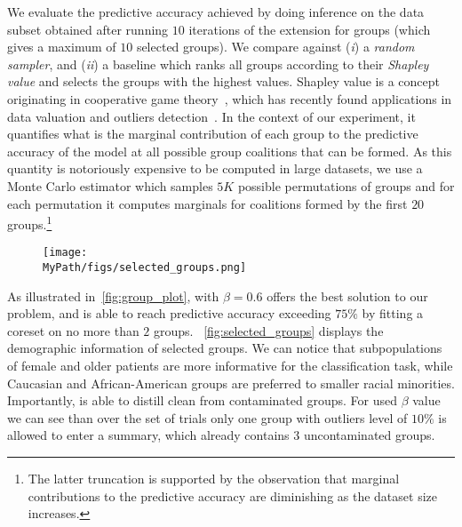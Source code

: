 We evaluate the predictive accuracy achieved by doing inference on the data subset obtained after running $10$ iterations of the \bcores{} extension for groups (which gives a maximum of $10$ selected groups). We compare against (\emph{i}) a \emph{random sampler}, and (\emph{ii}) a baseline which ranks all groups according to their \emph{Shapley value} and selects the groups with the highest values. Shapley value is a concept originating in cooperative game theory~\citep{shapley53}, which has recently found applications in data valuation and outliers detection~\citep{ghorbani19}. In the context of our experiment, it quantifies what is the marginal contribution of each group to the predictive accuracy of the model at all possible group coalitions that can be formed. As this quantity is notoriously expensive to be computed in large datasets, we use a Monte Carlo estimator which samples $5K$ possible permutations of groups and for each permutation it computes marginals for coalitions formed by the first $20$ groups.\footnote{The latter truncation is supported by the observation that marginal contributions to the predictive accuracy are diminishing as the dataset size increases.}

\begin{figure*}[!t]
	\begin{subfigure}[b]{.8\textwidth} 
		\centering
		\texttt{[image: \\MyPath/figs/selected\_groups.png]}
	\end{subfigure}	
	\centering
	\caption{Attributes of selected groups after running $10$ iterations of \bcores{} with $\beta=0.6$ on the contaminated \textsc{HospitalReadmissions} dataset (repeated over $5$ random trials).}
	\label{fig:selected_groups}
\end{figure*}

As illustrated in~\cref{fig:group_plot}, \bcores{} with $\beta=0.6$ offers the best solution to our problem, and is able to reach predictive accuracy exceeding $75\%$ by fitting a coreset on no more than $2$ groups. ~\cref{fig:selected_groups} displays the demographic information of selected groups. We can notice that subpopulations of female and older patients are more informative for the classification task, while Caucasian and African-American groups are preferred to smaller racial minorities. Importantly, \bcores{} is able to distill clean from contaminated groups. For used $\beta$ value we can see than over the set of trials only one group with outliers level of $10\%$ is allowed to enter a summary, which already contains $3$ uncontaminated groups.

